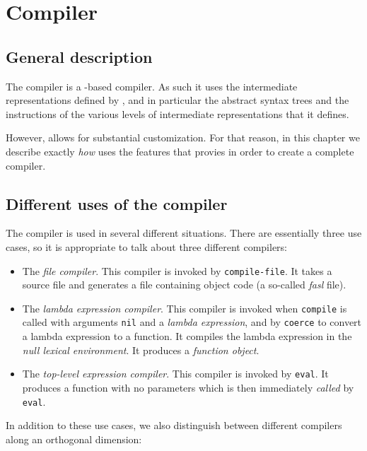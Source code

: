 \chapter{Compiler}
\label{chap-compiler}

\section{General description}

The \sysname{} compiler is a \cleavir{}-based compiler.  As such it uses
the intermediate representations defined by \cleavir{}, and in
particular the abstract syntax trees and the instructions of the
various levels of intermediate representations that it defines.

However, \cleavir{} allows for substantial customization.  For that
reason, in this chapter we describe exactly \emph{how} \sysname{} uses
the features that \cleavir{} provies in order to create a complete
compiler.

\section{Different uses of the compiler}

The compiler is used in several different situations.  There are
essentially three use cases, so it is appropriate to talk about three
different compilers:

\begin{itemize}
\item The \emph{file compiler}.  This compiler is invoked by
  \texttt{compile-file}.  It takes a \commonlisp{} source file and generates a
  file containing object code (a so-called \emph{fasl} file). 
\item The \emph{lambda expression compiler}.  This compiler is invoked
  when \texttt{compile} is called with arguments \texttt{nil} and a
  \emph{lambda expression}, and by \texttt{coerce} to convert a lambda
  expression to a function.  It compiles the lambda expression in the
  \emph{null lexical environment}.  It produces a \emph{function
    object}.
\item The \emph{top-level expression compiler}.  This compiler is
  invoked by \texttt{eval}.  It produces a function with no parameters
  which is then immediately \emph{called} by \texttt{eval}.  
\end{itemize}

In addition to these use cases, we also distinguish between different
compilers along an orthogonal dimension:

